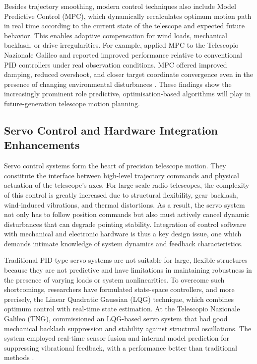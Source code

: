     Besides trajectory smoothing, modern control techniques also include Model Predictive Control (MPC), which dynamically recalculates optimum motion path in real time according to the current state of the telescope and expected future behavior. This enables adaptive compensation for wind loads, mechanical backlash, or drive irregularities. For example, \cite{Petrillo2024} applied MPC to the Telescopio Nazionale Galileo and reported improved performance relative to conventional PID controllers under real observation conditions. MPC offered improved damping, reduced overshoot, and closer target coordinate convergence even in the presence of changing environmental disturbances \cite{Petrillo2024}. These findings show the increasingly prominent role predictive, optimisation-based algorithms will play in future-generation telescope motion planning.

    \subsection{Servo Control and Hardware Integration Enhancements}
    Servo control systems form the heart of precision telescope motion. They constitute the interface between high-level trajectory commands and physical actuation of the telescope's axes. For large-scale radio telescopes, the complexity of this control is greatly increased due to structural flexibility, gear backlash, wind-induced vibrations, and thermal distortions. As a result, the servo system not only has to follow position commands but also must actively cancel dynamic disturbances that can degrade pointing stability. Integration of control software with mechanical and electronic hardware is thus a key design issue, one which demands intimate knowledge of system dynamics and feedback characteristics.

    Traditional PID-type servo systems are not suitable for large, flexible structures because they are not predictive and have limitations in maintaining robustness in the presence of varying loads or system nonlinearities. To overcome such shortcomings, researchers have formulated state-space controllers, and more precisely, the Linear Quadratic Gaussian (LQG) technique, which combines optimum control with real-time state estimation. At the Telescopio Nazionale Galileo (TNG), \cite{Schipani2020} commissioned an LQG-based servo system that had good mechanical backlash suppression and stability against structural oscillations. The system employed real-time sensor fusion and internal model prediction for suppressing vibrational feedback, with a performance better than traditional methods \cite{Schipani2020}.

